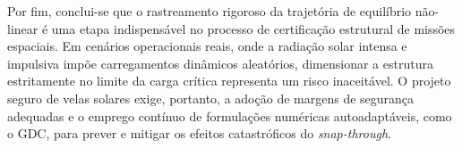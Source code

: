 Por fim, conclui-se que o rastreamento rigoroso da trajetória de equilíbrio não-linear é uma etapa indispensável no processo de certificação estrutural de missões espaciais. Em cenários operacionais reais, onde a radiação solar intensa e impulsiva impõe carregamentos dinâmicos aleatórios, dimensionar a estrutura estritamente no limite da carga crítica representa um risco inaceitável. O projeto seguro de velas solares exige, portanto, a adoção de margens de segurança adequadas e o emprego contínuo de formulações numéricas autoadaptáveis, como o GDC, para prever e mitigar os efeitos catastróficos do \textit{snap-through}.

